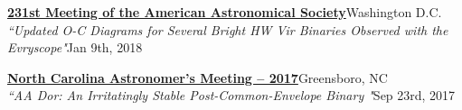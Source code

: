 \documentclass[letterpaper,12pt]{article}
\begin{document}
\begin{etaremune}
    \item \href{https://aas.org/meetings/aas231}{{\small\textbf{231st Meeting of the American Astronomical Society}}}\hfill{\small Washington D.C.}\\
    {\scriptsize \textit{``Updated O-C Diagrams for Several Bright HW Vir Binaries Observed with the Evryscope"}\hfill \footnotesize Jan 9th, 2018}\vspace{-1mm}
    \item \href{https://www.gtcc.edu/community-engagement/cline-observatory/special-lectures-and-events/ncam.php}{\small\textbf{North Carolina Astronomer's Meeting -- 2017}}\hfill {Greensboro, NC}\\
    {\scriptsize \textit{``AA Dor: An Irritatingly Stable Post-Common-Envelope Binary "}\hfill \footnotesize Sep 23rd, 2017}\vspace{-2mm}
\end{etaremune}
\end{document}
